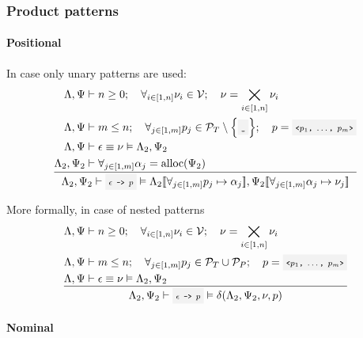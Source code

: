 \clearpage

\subsubsection{Product patterns}

\paragraph{Positional}

In case only unary patterns are used:
\[
	\oprule[aligned]{
		\EnvLoc,\EnvStore      &\then n \geq 0 \semiq \forall_{i\in[1,n]}{\val_i\in\Val} \semiq \val = \bigtimes_{i \in [1,n]}{\val_i} \\*
		\EnvLoc,\EnvStore      &\then m \leq n \semiq \forall_{j\in[1,m]}{\pattern_j\in\PatternTerminal\setminus\set{\code{\_}}} \semiq \pattern = \code{<$\pattern_1$, $\dotsc$, $\pattern_m$>} \\*
		\EnvLoc,\EnvStore      &\then \expr \eval \val \Then \EnvLoc_2,\EnvStore_2 \\*
		\EnvLoc_2,\EnvStore_2  &\then \forall_{j\in[1,m]}{\addr_j = \alloc(\EnvStore_2)} \\*
	}{
		\EnvLoc_2,\EnvStore_2 \then \code{$\expr$ -> $\pattern$} \Then \EnvLoc_2\env{\forall_{j\in[1,m]}{\pattern_j\mapsto\addr_j}},\EnvStore_2\env{\forall_{j\in[1,m]}{\addr_j\mapsto\val_j}}
	}
\]

\vspace{\baselineskip}

More formally, in case of nested patterns
\[
	\oprule[aligned]{
		\EnvLoc,\EnvStore &\then n \geq 0 \semiq \forall_{i\in[1,n]}{\val_i\in\Val} \semiq \val = \bigtimes_{i \in [1,n]}{\val_i} \\*
		\EnvLoc,\EnvStore &\then m \leq n \semiq \forall_{j\in[1,m]}{\pattern_j\in\PatternTerminal\cup\PatternProduct} \semiq \pattern = \code{<$\pattern_1$, $\dotsc$, $\pattern_m$>} \\*
		\EnvLoc,\EnvStore &\then \expr \eval \val \Then \EnvLoc_2,\EnvStore_2 \\*
	}{
		\EnvLoc_2,\EnvStore_2 \then \code{$\expr$ -> $\pattern$} \Then \decons(\EnvLoc_2,\EnvStore_2,\val,\pattern)
	}
\]

\paragraph{Nominal}

